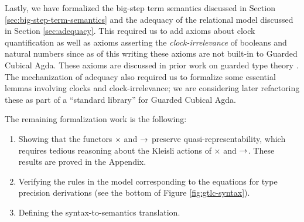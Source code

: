 Lastly, we have formalized the big-step term semantics discussed in Section
\ref{sec:big-step-term-semantics} and the adequacy of the relational model
discussed in Section \ref{sec:adequacy}. This required us to add axioms about
clock quantification as well as axioms asserting the \emph{clock-irrelevance} of
booleans and natural numbers since as of this writing these axioms are not
built-in to Guarded Cubical Agda. These axioms are discussed in prior work on
guarded type theory \cite{atkey-mcbride2013, kristensen-mogelberg-vezzosi2022}.
The mechanization of adequacy also required us to formalize some essential
lemmas involving clocks and clock-irrelevance; we are considering later
refactoring these as part of a ``standard library'' for Guarded Cubical
Agda.

The remaining formalization work is the following:
\begin{enumerate}
    \item Showing that the functors $\times$ and $\to$ preserve
    quasi-representability, which requires tedious reasoning about the Kleisli actions of
    $\times$ and $\to$. These results are proved in the Appendix.
    \item Verifying the rules in the model corresponding to the equations for
    type precision derivations (see the bottom of Figure \ref{fig:gtlc-syntax}).
    \item Defining the syntax-to-semantics translation.
\end{enumerate} 

